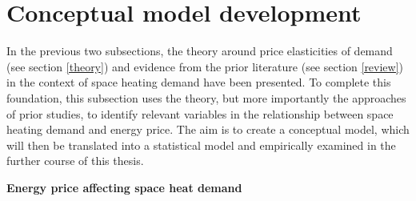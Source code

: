 \documentclass[12pt,twoside]{reedthesis}
\begin{document}
\hypertarget{conceptual_model}{%
\section{Conceptual model development}\label{conceptual_model}}

In the previous two subsections, the theory around price elasticities of demand (see section \ref{theory}) and evidence from the prior literature (see section \ref{review}) in the context of space heating demand have been presented. To complete this foundation, this subsection uses the theory, but more importantly the approaches of prior studies, to identify relevant variables in the relationship between space heating demand and energy price. The aim is to create a conceptual model, which will then be translated into a statistical model and empirically examined in the further course of this thesis.

\textbf{Energy price affecting space heat demand}
\end{document}
